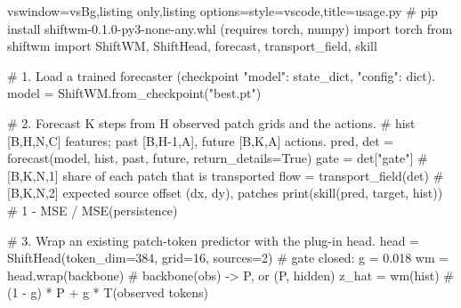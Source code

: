 \par\medskip\noindent\begin{minipage}{\linewidth}
\begin{tcblisting}{vswindow=vsBg,listing only,listing options={style=vscode},title={\vsdots\hspace{2mm}usage.py}}
# pip install shiftwm-0.1.0-py3-none-any.whl       (requires torch, numpy)
import torch
from shiftwm import ShiftWM, ShiftHead, forecast, transport_field, skill

# 1. Load a trained forecaster (checkpoint {"model": state_dict, "config": dict}).
model = ShiftWM.from_checkpoint("best.pt")

# 2. Forecast K steps from H observed patch grids and the actions.
#    hist [B,H,N,C] features; past [B,H-1,A], future [B,K,A] actions.
pred, det = forecast(model, hist, past, future, return_details=True)
gate = det["gate"]               # [B,K,N,1] share of each patch that is transported
flow = transport_field(det)      # [B,K,N,2] expected source offset (dx, dy), patches
print(skill(pred, target, hist)) # 1 - MSE / MSE(persistence)

# 3. Wrap an existing patch-token predictor with the plug-in head.
head = ShiftHead(token_dim=384, grid=16, sources=2)  # gate closed: g = 0.018
wm = head.wrap(backbone)         # backbone(obs) -> P, or (P, hidden)
z_hat = wm(hist)                 # (1 - g) * P + g * T(observed tokens)
\end{tcblisting}
\label{fig:sw-code}
\end{minipage}\par\medskip
